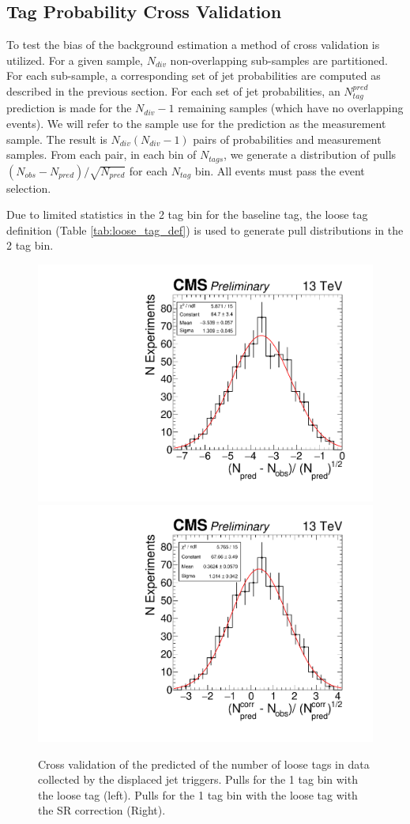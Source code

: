 \subsection{Tag Probability Cross Validation}
\label{sec:xval}

To test the bias of the background estimation a method of cross validation is utilized. For a given sample, $N_{div}$ non-overlapping  sub-samples are partitioned. 
For each sub-sample, a corresponding set of jet probabilities are computed as described in the previous section. 
For each set of jet probabilities, an $N_{tag}^{pred}$  prediction is made for the $N_{div}-1$ remaining samples (which have no overlapping events). We will
refer to the sample use for the prediction as the measurement sample. The result is $N_{div}(N_{div}-1)$ pairs of probabilities and measurement samples. 
From each pair, in each bin of $N_{tags}$, we  generate a distribution of pulls $(N_{obs} - N_{pred}) / \sqrt{N_{pred}}$ for each $N_{tag}$ bin. All events must pass the event selection.

Due to limited statistics in the 2 tag bin for the baseline tag, the loose tag definition (Table \ref{tab:loose_tag_def}) is used to generate pull distributions in the 2 tag bin. 

\begin{figure}
\begin{center}
\includegraphics[width=.45\textwidth]{figures/an/ANALYSIS/pulls/data_loose_uncorrected_1tag.pdf}
\includegraphics[width=.45\textwidth]{figures/an/ANALYSIS/pulls/data_loose_corrected_1tag.pdf}
\caption{Cross validation of the predicted of the number of loose tags in data collected by the displaced jet triggers. Pulls for the 1 tag bin with the loose tag (left). Pulls for the 1 tag bin with the loose tag with the SR correction (Right).   \label{fig:djetpd_1tag_xval}}
\end{center}
\end{figure}

